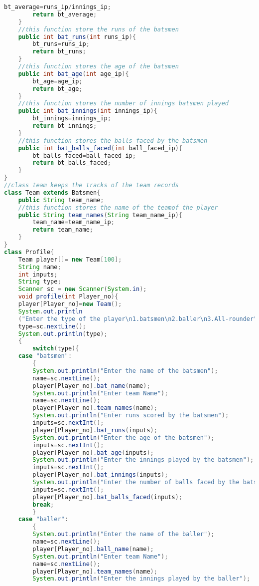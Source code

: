 \documentclass{article}
\begin{document}
\begin{lstlisting}[style=chstyle,language=Java]
        bt_average=runs_ip/innings_ip;
        return bt_average;
    }
    //this function store the runs of the batsmen
    public int bat_runs(int runs_ip){
        bt_runs=runs_ip;
        return bt_runs;
    }
    //this function stores the age of the batsmen
    public int bat_age(int age_ip){
        bt_age=age_ip;
        return bt_age;
    }
    //this function stores the number of innings batsmen played
    public int bat_innings(int innings_ip){
        bt_innings=innings_ip;
        return bt_innings;
    }
    //this function stores the balls faced by the batsmen
    public int bat_balls_faced(int ball_faced_ip){
        bt_balls_faced=ball_faced_ip;
        return bt_balls_faced;
    }
}
//class team keeps the tracks of the team records
class Team extends Batsmen{
    public String team_name;
    //this function stores the name of the teamof the player
    public String team_names(String team_name_ip){
        team_name=team_name_ip;
        return team_name;
    }
}
class Profile{
    Team player[]= new Team[100];
    String name;
    int inputs;
    String type;
    Scanner sc = new Scanner(System.in);
    void profile(int Player_no){
    player[Player_no]=new Team();
    System.out.println
    ("Enter the type of the player\n1.batsmen\n2.baller\n3.All-rounder");
    type=sc.nextLine();
    System.out.println(type);
    {
        switch(type){
    case "batsmen":
        {
        System.out.println("Enter the name of the batsmen");
        name=sc.nextLine();
        player[Player_no].bat_name(name);
        System.out.println("Enter team Name");
        name=sc.nextLine();
        player[Player_no].team_names(name);
        System.out.println("Enter runs scored by the batsmen");
        inputs=sc.nextInt();
        player[Player_no].bat_runs(inputs);
        System.out.println("Enter the age of the batsmen");
        inputs=sc.nextInt();
        player[Player_no].bat_age(inputs);
        System.out.println("Enter the innings played by the batsmen");
        inputs=sc.nextInt();
        player[Player_no].bat_innings(inputs); 
        System.out.println("Enter the number of balls faced by the batsmen");
        inputs=sc.nextInt();
        player[Player_no].bat_balls_faced(inputs);
        break;
        }
    case "baller":
        {
        System.out.println("Enter the name of the baller");
        name=sc.nextLine();
        player[Player_no].ball_name(name); 
        System.out.println("Enter team Name");
        name=sc.nextLine();
        player[Player_no].team_names(name);
        System.out.println("Enter the innings played by the baller"); 

\end{lstlisting}
\end{document}
